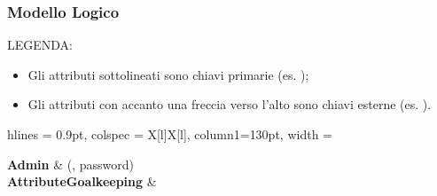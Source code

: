 \newpage

\subsubsection{Modello Logico}

LEGENDA:

\begin{itemize}
	\item Gli attributi sottolineati sono chiavi primarie
		(es. );
	\item Gli attributi con accanto una freccia
	verso l'alto sono chiavi esterne
		(es. ).
\end{itemize}

\bigskip

\begin{tblr}{
    hlines = {0.9pt},
    colspec = {X[l]X[l]}, column{1}={130pt},
    width = \textwidth
}

	{
		\textbf{Admin}
	}
	&
	{
		(, password)
	}
	\\
	{
		\textbf{AttributeGoalkeeping}
	}
	&
	{
		
}
\end{tblr}
